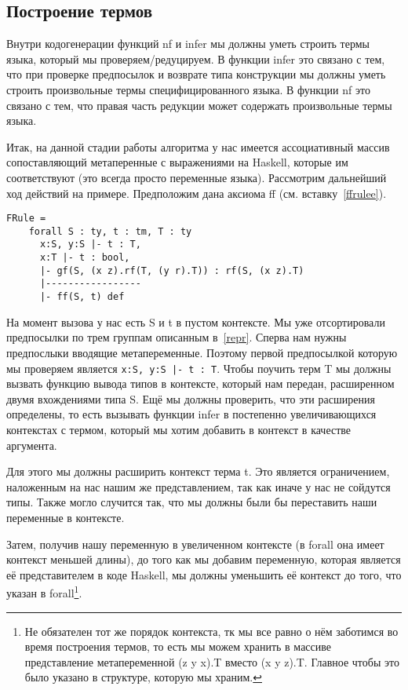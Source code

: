 \subsection{Построение термов}\label{build_exp}

Внутри кодогенерации функций nf и infer мы должны уметь строить термы языка, который мы проверяем/редуцируем. В функции infer это связано с тем, что при проверке предпосылок и возврате типа конструкции мы должны уметь строить произвольные термы специфицированного языка. В функции nf это связано с тем, что правая часть редукции может содержать произвольные термы языка.

Итак, на данной стадии работы алгоритма у нас имеется ассоциативный массив сопоставляющий метаперенные с выражениями на Haskell, которые им соответствуют (это всегда просто переменные языка). Рассмотрим дальнейший ход действий на примере. Предположим дана аксиома ff (см. вставку~\ref{ffrulee}).

\begin{lstlisting}[label={ffrulee}, caption={Искусственное правило вывода для конструкции ff},captionpos=b, frame=single, float, floatplacement=H]
FRule =
    forall S : ty, t : tm, T : ty
      x:S, y:S |- t : T,
      x:T |- t : bool,
      |- gf(S, (x z).rf(T, (y r).T)) : rf(S, (x z).T)
      |-----------------
      |- ff(S, t) def
\end{lstlisting}

На момент вызова у нас есть S и t в пустом контексте. Мы уже отсортировали предпосылки по трем группам описанным в~\ref{repr}. Сперва нам нужны предпослыки вводящие метапеременные. Поэтому первой предпосылкой которую мы проверяем является \lstinline{x:S, y:S |- t : T}. Чтобы поучить терм T мы должны вызвать функцию вывода типов в контексте, который нам передан, расширенном двумя вхождениями типа S. Ещё мы должны проверить, что эти расширения определены, то есть вызывать функции infer в постепенно увеличивающихся контекстах с термом, который мы хотим добавить в контекст в качестве аргумента.

Для этого мы должны расширить контекст терма t. Это является ограничением, наложенным на нас нашим же представлением, так как иначе у нас не сойдутся типы. Также могло случится так, что мы должны были бы переставить наши переменные в контексте.

Затем, получив нашу переменную в увеличенном контексте (в forall она имеет контекст меньшей длины), до того как мы добавим переменную, которая является её представителем в коде Haskell, мы должны уменьшить её контекст до того, что указан в forall\footnote{Не обязателен тот же порядок контекста, тк мы все равно о нём заботимся во время построения термов, то есть мы можем хранить в массиве представление метапеременной (z y x).T вместо (x y z).T. Главное чтобы это было указано в структуре, которую мы храним.}.

